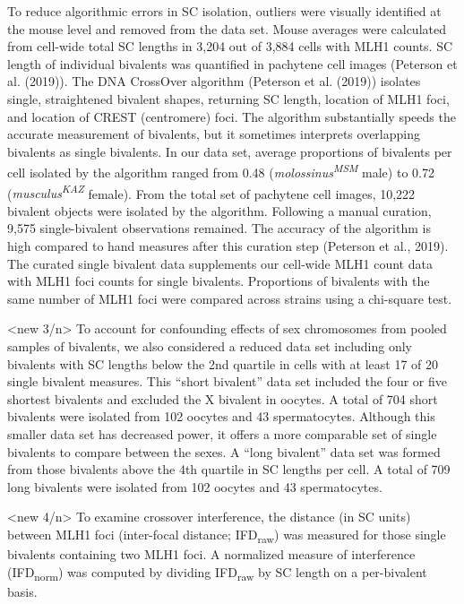 \documentclass[
]{article}
\begin{document}
To reduce algorithmic errors in SC isolation, outliers were visually
identified at the mouse level and removed from the data set. Mouse
averages were calculated from cell-wide total SC lengths in 3,204 out of
3,884 cells with MLH1 counts. SC length of individual bivalents was
quantified in pachytene cell images (Peterson et al. (2019)). The DNA
CrossOver algorithm (Peterson et al. (2019)) isolates single,
straightened bivalent shapes, returning SC length, location of MLH1
foci, and location of CREST (centromere) foci. The algorithm
substantially speeds the accurate measurement of bivalents, but it
sometimes interprets overlapping bivalents as single bivalents. In our
data set, average proportions of bivalents per cell isolated by the
algorithm ranged from 0.48 (\emph{molossinus\textsuperscript{MSM}} male)
to 0.72 (\emph{musculus\textsuperscript{KAZ}} female). From the total
set of pachytene cell images, 10,222 bivalent objects were isolated by
the algorithm. Following a manual curation, 9,575 single-bivalent
observations remained. The accuracy of the algorithm is high compared to
hand measures after this curation step (Peterson et al., 2019). The
curated single bivalent data supplements our cell-wide MLH1 count data
with MLH1 foci counts for single bivalents. Proportions of bivalents
with the same number of MLH1 foci were compared across strains using a
chi-square test.

\textless new 3/n\textgreater{} To account for confounding effects of
sex chromosomes from pooled samples of bivalents, we also considered a
reduced data set including only bivalents with SC lengths below the 2nd
quartile in cells with at least 17 of 20 single bivalent measures. This
``short bivalent'' data set included the four or five shortest bivalents
and excluded the X bivalent in oocytes. A total of 704 short bivalents
were isolated from 102 oocytes and 43 spermatocytes. Although this
smaller data set has decreased power, it offers a more comparable set of
single bivalents to compare between the sexes. A ``long bivalent'' data
set was formed from those bivalents above the 4th quartile in SC lengths
per cell. A total of 709 long bivalents were isolated from 102 oocytes
and 43 spermatocytes.

\textless new 4/n\textgreater{} To examine crossover interference, the
distance (in SC units) between MLH1 foci (inter-focal distance;
IFD\textsubscript{raw}) was measured for those single bivalents
containing two MLH1 foci. A normalized measure of interference
(IFD\textsubscript{norm}) was computed by dividing
IFD\textsubscript{raw} by SC length on a per-bivalent basis.
\end{document}
